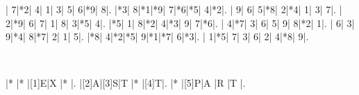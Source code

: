 \documentclass[]{article}
\begin{document}
\begin{Sudoku}
	| 7|*2| 4| 1| 3| 5| 6|*9| 8|.
	|*3| 8|*1|*9| 7|*6|*5| 4|*2|.
	| 9| 6| 5|*8| 2|*4| 1| 3| 7|.
	| 2|*9| 6| 7| 1| 8| 3|*5| 4|.
	|*5| 1| 8|*2| 4|*3| 9| 7|*6|.
	| 4|*7| 3| 6| 5| 9| 8|*2| 1|.
	| 6| 3| 9|*4| 8|*7| 2| 1| 5|.
	|*8| 4|*2|*5| 9|*1|*7| 6|*3|.
	| 1|*5| 7| 3| 6| 2| 4|*8| 9|.
\end{Sudoku}

\\

\begin{Puzzle}{5}{3}
	|*   |*   |[1]E|X  |*   |.
	|[2]A|[3]S|T   |*  |[4]T|.
	|*   |[5]P|A   |R  |T   |.
\end{Puzzle}
\end{document}
